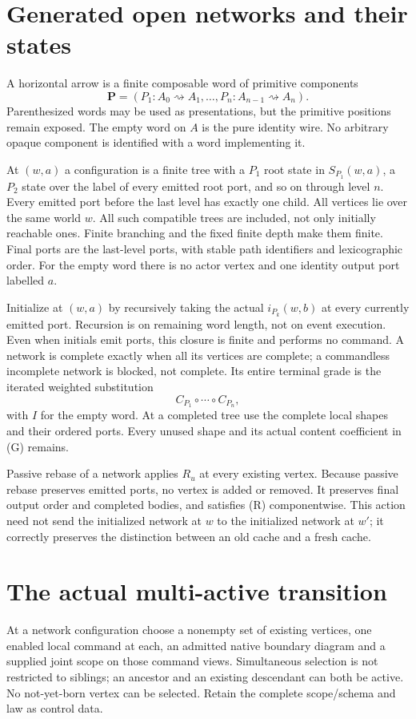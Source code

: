 \documentclass[11pt]{article}
\begin{document}
\section{Generated open networks and their states}
A horizontal arrow is a finite composable word of primitive components
\[
 \mathbf P=(P_1:A_0\rightsquigarrow A_1,\ldots,P_n:A_{n-1}\rightsquigarrow A_n).
\]
Parenthesized words may be used as presentations, but the primitive positions remain exposed. The empty word on $A$ is the pure identity wire. No arbitrary opaque component is identified with a word implementing it.

At $(w,a)$ a configuration is a finite tree with a $P_1$ root state in $S_{P_1}(w,a)$, a $P_2$ state over the label of every emitted root port, and so on through level $n$. Every emitted port before the last level has exactly one child. All vertices lie over the same world $w$. All such compatible trees are included, not only initially reachable ones. Finite branching and the fixed finite depth make them finite. Final ports are the last-level ports, with stable path identifiers and lexicographic order. For the empty word there is no actor vertex and one identity output port labelled $a$.

Initialize at $(w,a)$ by recursively taking the actual $i_{P_k}(w,b)$ at every currently emitted port. Recursion is on remaining word length, not on event execution. Even when initials emit ports, this closure is finite and performs no command. A network is complete exactly when all its vertices are complete; a commandless incomplete network is blocked, not complete. Its entire terminal grade is the iterated weighted substitution
\[
 C_{P_1}\circ\cdots\circ C_{P_n},                       \tag{G}
\]
with $I$ for the empty word. At a completed tree use the complete local shapes and their ordered ports. Every unused shape and its actual content coefficient in (G) remains.

Passive rebase of a network applies $R_u$ at every existing vertex. Because passive rebase preserves emitted ports, no vertex is added or removed. It preserves final output order and completed bodies, and satisfies (R) componentwise. This action need not send the initialized network at $w$ to the initialized network at $w'$; it correctly preserves the distinction between an old cache and a fresh cache.

\section{The actual multi-active transition}
At a network configuration choose a nonempty set of existing vertices, one enabled local command at each, an admitted native boundary diagram and a supplied joint scope on those command views. Simultaneous selection is not restricted to siblings; an ancestor and an existing descendant can both be active. No not-yet-born vertex can be selected. Retain the complete scope/schema and law as control data.
\end{document}
